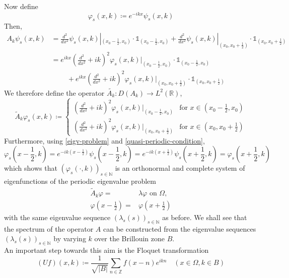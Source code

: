 \documentclass[fontsize=14pt,a4paper,DIV=1]{scrartcl}
\numberwithin{equation}{section}
\newcommand{\R}{\mathbb{R}}
\newcommand{\Z}{\mathbb{Z}}
\newcommand{\N}{\mathbb{N}}
\begin{document}
	Now define
		\[ \varphi_{s}(x, k) \coloneqq e^{-ikx} \psi_{s}(x, k) \]
	Then,
		\begin{align*}
			A_{k} \psi_{s}(x, k) & = \frac{d^{2}}{dx^{2}} \psi_{s}(x, k)|_{(x_{0} - \frac{1}{2}, x_{0})} \cdot \mathds{1}_{(x_{0} - \frac{1}{2}, x_{0})} + \frac{d^{2}}{dx^{2}} \psi_{s}(x, k)|_{(x_{0}, x_{0}  + \frac{1}{2})} \cdot \mathds{1}_{(x_{0}, x_{0} + \frac{1}{2})} \\
				& = e^{ikx} \left( \frac{d^{2}}{dx^{2}} + ik \right)^{2} \varphi_{s}(x, k)|_{(x_{0} - \frac{1}{2}, x_{0})} \cdot \mathds{1}_{(x_{0} - \frac{1}{2}, x_{0})} \\
				& ~\qquad + e^{ikx} \left( \frac{d^{2}}{dx^{2}} + ik \right)^{2} \varphi_{s}(x, k)|_{(x_{0}, x_{0}  + \frac{1}{2})} \cdot \mathds{1}_{(x_{0}, x_{0} + \frac{1}{2})}
		\end{align*}
	We therefore define the operator $\tilde{A_{k}} \colon D(A_{k}) \rightarrow L^{2}(\R)$, 
	\[ \tilde{A}_{k} \varphi_{s}(x, k) \coloneqq \begin{cases}
 		\left( \frac{d^{2}}{dx^{2}} + ik \right)^{2} \varphi_{s}(x, k)|_{(x_{0} - \frac{1}{2}, x_{0})} & \text{for } x \in (x_{0} - \frac{1}{2}, x_{0}) \\ \left( \frac{d^{2}}{dx^{2}} + ik \right)^{2} \varphi_{s}(x, k)|_{(x_{0}, x_{0}  + \frac{1}{2})} & \text{for } x \in (x_{0}, x_{0} + \frac{1}{2})
 	\end{cases} \] 
	Furthermore, using  \eqref{eigv-problem} and \eqref{quasi-periodic-condition},
		\[ \varphi_{s}(x - \frac{1}{2}, k) = e^{-ik(x - \frac{1}{2})} \psi_{s}(x - \frac{1}{2}, k) = e^{-ik(x + \frac{1}{2})} \psi_{s}(x + \frac{1}{2}, k) = \varphi_{s}(x + \frac{1}{2}, k) \]
	which shows that $(\varphi_{s}(\cdot, k))_{s \in \N}$ is an orthonormal and complete system of eigenfunctions of the periodic eigenvalue problem
	\begin{eqnarray}
		\tilde{A}_{k} \varphi = & \lambda
		 \varphi \text{ on } \Omega, \label{mod-eigv-problem} \\
		 \varphi(x - \frac{1}{2}) = & \varphi(x + \frac{1}{2}) \label{periodic-condition}
	\end{eqnarray}
	with the same eigenvalue sequence $(\lambda_{s}(s))_{s \in \N}$ as before. We shall see that the spectrum of the operator $A$ can be constructed from the eigenvalue sequences $(\lambda_{s}(s))_{s \in \N}$ by varying $k$ over the Brillouin zone $B$.\\
	
	An important step towards this aim is the Floquet transformation
		\begin{equation}
			(Uf)(x, k) \coloneqq \frac{1}{\sqrt{|B|}} \sum_{n \in \Z} f(x - n) e^{ikn} \quad (x \in \Omega, k \in B) \label{floquet-transformation}
		\end{equation}
		
\end{document}
